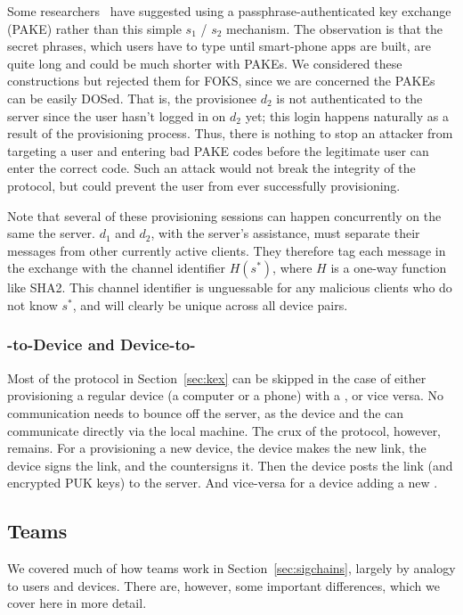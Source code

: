 Some researchers~\cite{ncc2019} have suggested using a passphrase-authenticated
key exchange (PAKE) rather than this simple $s_1$ / $s_2$ mechanism. The
observation is that the secret phrases, which users have to type until
smart-phone apps are built, are quite long and could be much shorter with PAKEs.
We considered these constructions but rejected them for FOKS, since we are
concerned the PAKEs can be easily DOSed. That is, the provisionee $d_2$ is not
authenticated to the server since the user hasn't logged in on $d_2$ yet; this
login happens naturally as a result of the provisioning process. Thus, there is
nothing to stop an attacker from targeting a user and entering bad PAKE codes
before the legitimate user can enter the correct code. Such an attack would not
break the integrity of the protocol, but could prevent the user from ever
successfully provisioning.

Note that several of these provisioning sessions can happen concurrently on the
same the server. $d_1$ and $d_2$, with the server's assistance, must separate
their messages from other currently active clients.  They therefore tag each
message in the exchange with the channel identifier $H(s^{*})$, where $H$ is a
one-way function like SHA2. This channel identifier is unguessable for 
any malicious clients who do not know $s^{*}$, and will clearly be unique
across all device pairs.

\subsubsection{\Yubi -to-Device and Device-to-\Yubi }

Most of the protocol in Section~\ref{sec:kex} can be skipped in the case
of either provisioning a regular device (a computer or a phone) with a \yubi ,
or vice versa. No communication needs to bounce off the server, as the device
and the \yubi{} can communicate directly via the local machine. The crux of 
the protocol, however, remains. For a \yubi{} provisioning a new device,
the device makes the new link, the device signs the link, and the \yubi{} 
countersigns it. Then the device posts the link (and encrypted PUK keys)
to the server. And vice-versa for a device adding a new \yubi . 

\subsection{Teams}
\label{sec:teams}

We covered much of how teams work in Section~\ref{sec:sigchains}, largely by
analogy to users and devices. There are, however, some important differences,
which we cover here in more detail.

